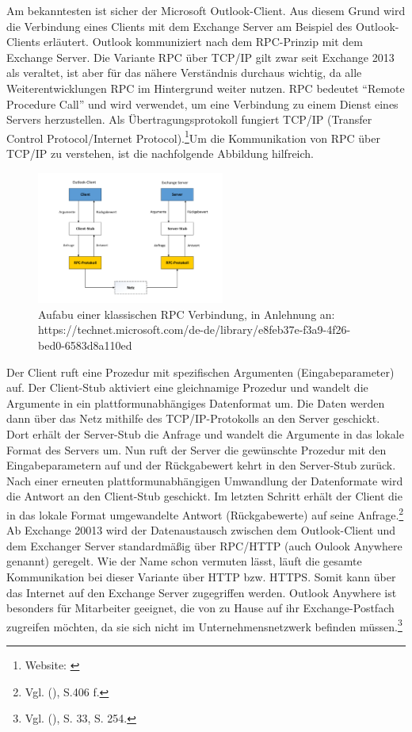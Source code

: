 Am bekanntesten ist sicher der Microsoft Outlook-Client. Aus diesem Grund wird die Verbindung eines Clients mit dem Exchange Server am Beispiel des Outlook-Clients erläutert. Outlook kommuniziert nach dem RPC-Prinzip mit dem Exchange Server. Die Variante RPC über TCP/IP  gilt zwar seit Exchange 2013 als veraltet, ist aber für das nähere Verständnis durchaus wichtig, da alle Weiterentwicklungen RPC im Hintergrund weiter nutzen. RPC bedeutet \enquote{Remote Procedure Call} und wird verwendet, um eine Verbindung zu einem Dienst eines Servers herzustellen. Als Übertragungsprotokoll fungiert TCP/IP (Transfer Control Protocol/Internet Protocol).\footnote{Website: \cite{MSXrpc}}Um die Kommunikation von RPC über TCP/IP zu verstehen, ist die nachfolgende Abbildung hilfreich.

\begin{figure}[h!]
\centering
	\includegraphics[width=0.55\textwidth]{Abbildungen/RPC_TCP.pdf}
	\caption[Aufbau einer klassischen RPC Verbindung]{Aufabu einer klassischen RPC Verbindung,    in Anlehnung an:\\https://technet.microsoft.com/de-de/library/e8feb37e-f3a9-4f26-bed0-6583d8a110ed}
	\label{fig:RPC_TCP}
\end{figure}

\noindent 
Der Client ruft eine Prozedur mit spezifischen Argumenten (Eingabeparameter) auf. Der Client-Stub aktiviert eine gleichnamige Prozedur und wandelt die Argumente in ein plattformunabhängiges Datenformat um. Die Daten werden dann über das Netz mithilfe des TCP/IP-Protokolls an den Server geschickt. Dort erhält der Server-Stub die Anfrage und wandelt die Argumente in das lokale Format des Servers um. Nun ruft der Server die gewünschte Prozedur mit den Eingabeparametern auf und der Rückgabewert kehrt in den Server-Stub zurück. Nach einer erneuten plattformunabhängigen Umwandlung der Datenformate wird die Antwort an den Client-Stub geschickt. Im letzten Schritt erhält der Client die in das lokale Format umgewandelte Antwort (Rückgabewerte) auf seine Anfrage.\footnote{Vgl. \citeauthor{Schneider} (\citeyear{Schneider}), S.406 f.}\newline
Ab Exchange 20013 wird der Datenaustausch zwischen dem Outlook-Client und dem Exchanger Server standardmäßig über RPC/HTTP (auch Oulook Anywhere genannt) geregelt. Wie der Name schon vermuten lässt, läuft die gesamte Kommunikation bei dieser Variante über HTTP bzw. HTTPS. Somit kann über das Internet auf den Exchange Server zugegriffen werden. Outlook Anywhere ist besonders für Mitarbeiter geeignet, die von zu Hause auf ihr Exchange-Postfach zugreifen möchten, da sie sich nicht im Unternehmensnetzwerk befinden müssen.\footnote{Vgl. \citeauthor{Joos} (\citeyear{Joos}), S. 33, S. 254.}

